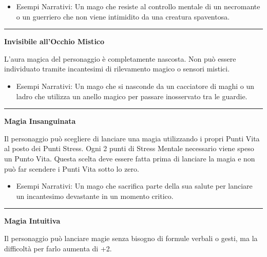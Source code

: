 \documentclass[../manuale_main.tex]{subfiles}
\begin{document}
\begin{itemize}
\item Esempi Narrativi: Un mago che resiste al controllo mentale di un necromante o un guerriero che non viene intimidito da una creatura spaventosa.
\end{itemize}

\vspace{0.5cm}\rule{\textwidth}{0.4pt}\vspace{1cm}

\begin{center}
\textbf{\large{Invisibile all'Occhio Mistico}}\\
\end{center}
L'aura magica del personaggio è completamente nascosta. Non può essere individuato tramite incantesimi di rilevamento magico o sensori mistici.

\begin{itemize}
\item Esempi Narrativi: Un mago che si nasconde da un cacciatore di maghi o un ladro che utilizza un anello magico per passare inosservato tra le guardie.
\end{itemize}

\vspace{0.5cm}\rule{\textwidth}{0.4pt}\vspace{1cm}

\begin{center}
\textbf{\large{Magia Insanguinata}}\\
\end{center}
Il personaggio può scegliere di lanciare una magia utilizzando i propri Punti Vita al posto dei Punti Stress. Ogni 2 punti di Stress Mentale necessario viene speso un Punto Vita. Questa scelta deve essere fatta prima di lanciare la magia e non può far scendere i Punti Vita sotto lo zero.

\begin{itemize}
\item Esempi Narrativi: Un mago che sacrifica parte della sua salute per lanciare un incantesimo devastante in un momento critico.
\end{itemize}

\vspace{0.5cm}\rule{\textwidth}{0.4pt}\vspace{1cm}

\begin{center}
\textbf{\large{Magia Intuitiva}}\\
\end{center}
Il personaggio può lanciare magie senza bisogno di formule verbali o gesti, ma la difficoltà per farlo aumenta di +2.
\end{document}
